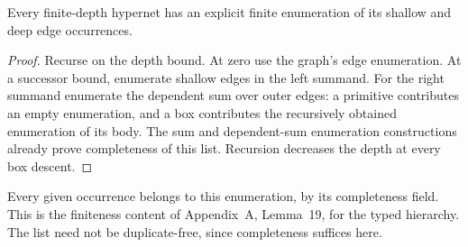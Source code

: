 \begin{theorem}
Every finite-depth hypernet has an explicit finite enumeration of its shallow
and deep edge occurrences.
\end{theorem}
\begin{proof}
Recurse on the depth bound. At zero use the graph's edge enumeration. At a
successor bound, enumerate shallow edges in the left summand. For the right
summand enumerate the dependent sum over outer edges: a primitive contributes
an empty enumeration, and a box contributes the recursively obtained enumeration
of its body. The sum and dependent-sum enumeration constructions already prove
completeness of this list. Recursion decreases the depth at every box descent.
\end{proof}
Every given occurrence belongs to this enumeration, by its completeness field.
This is the finiteness content of Appendix~A, Lemma~19, for the typed hierarchy.
The list need not be duplicate-free, since completeness suffices here.

